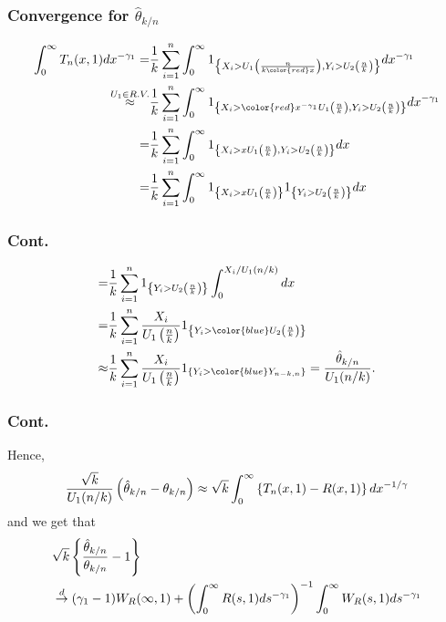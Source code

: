 \documentclass{beamer}
\begin{document}
\begin{frame}
    \frametitle{Convergence for $\hat{\theta}_{k/n}$}
$$
\begin{aligned}
\int_0^{\infty} T_n(x,1) dx^{-\gamma_1} =&\frac{1}{k}\sum_{i=1}^n \int_0^{\infty} 1_{\set{X_i>U_1\suit{\frac{n}{k{\color{red} x}}},Y_i>U_2\suit{\frac{n}{k}}}} dx^{-\gamma_1} \\
\stackrel{U_1\in R.V.}{\approx}& \frac{1}{k}\sum_{i=1}^n \int_0^{\infty} 1_{\set{X_i>{\color{red}x^{-\gamma_1}}U_1\suit{\frac{n}{k}},Y_i>U_2\suit{\frac{n}{k}}}} dx^{-\gamma_1} \\
=&\frac{1}{k}\sum_{i=1}^n \int_0^{\infty} 1_{\set{X_i>xU_1\suit{\frac{n}{k}},Y_i>U_2\suit{\frac{n}{k}}}} dx \\
=&\frac{1}{k}\sum_{i=1}^n \int_0^{\infty} 1_{\set{X_i>xU_1\suit{\frac{n}{k}}}} 1_{\set{Y_i>U_2\suit{\frac{n}{k}}}} dx
\end{aligned}
$$  

\end{frame}

\begin{frame}
    \frametitle{Cont.}
$$
\begin{aligned}
=&\frac{1}{k}\sum_{i=1}^n 1_{\set{Y_i>U_2\suit{\frac{n}{k}}}} \int_0^{X_i/U_1(n/k)}dx \\
=&\frac{1}{k}\sum_{i=1}^n \frac{X_i}{U_1\suit{\frac{n}{k}}}1_{\set{Y_i>{\color{blue} U_2\suit{\frac{n}{k}}}}} \\
\approx& \frac{1}{k}\sum_{i=1}^n \frac{X_i}{U_1\suit{\frac{n}{k}}}1_{\set{Y_i>{\color{blue} Y_{n-k,n}}}} =\frac{\hat{\theta}_{k/n}}{U_1(n/k)}. 
\end{aligned}
$$
    

\end{frame}

\begin{frame}
    \frametitle{Cont.}
Hence,
$$
\frac{\sqrt{k}}{U_1(n/k)}\left(\hat{\theta}_{k/n}-\theta_{k/n}\right)\approx \sqrt{k}\int_0^{\infty} \left\{T_n(x,1)-R(x,1)\right\}dx^{-1/\gamma}
$$
and we get that
$$
\begin{aligned}
&\sqrt{k}\left\{\frac{\hat{\theta}_{k/n}}{\theta_{k/n}}-1\right\}\\
& \stackrel{d}{\to} (\gamma_1-1)W_R(\infty,1)+\left(\int_0^{\infty} R(s,1)ds^{-\gamma
_1}\right)^{-1}\int_{0}^{\infty} W_R(s,1)ds^{-\gamma_1}
\end{aligned}
$$

\end{frame}
\end{document}
